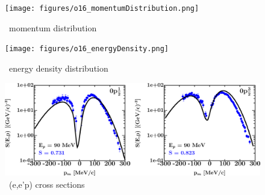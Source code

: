 \begin{figure}[H]
    \centering
    \texttt{[image: figures/o16\_momentumDistribution.png]}
    \caption{\oSix\ momentum distribution}
    \label{DOMFitData_o16_momentumDistribution}
\end{figure}

\begin{figure}[H]
    \centering
    \texttt{[image: figures/o16\_energyDensity.png]}
    \caption{\oSix\ energy density distribution}
    \label{DOMFitData_o16_energyDensity}
\end{figure}

\begin{figure}[H]
    \centering
    \includegraphics[width = 1.0\textwidth]{figures/o16_eep.png}
    \caption{\oSix\ (e,e'p) cross sections}
    \label{DOMFitData_o16_eep}
\end{figure}

